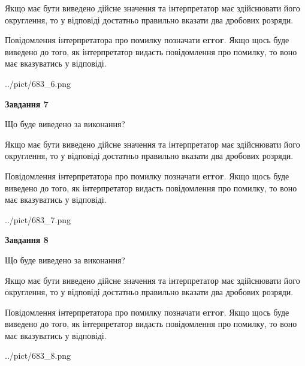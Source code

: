 \documentclass[12pt, ukrainian]{article}
\begin{document}
{\begin {Large}
Якщо має бути виведено дійсне значення та інтерпретатор має здійснювати його округлення, 
то у відповіді достатньо правильно вказати два дробових розряди.

Повідомлення інтерпретатора про помилку позначати \textbf{error}.
Якщо щось буде виведено до того, як інтерпретатор видасть повідомлення про помилку, 
то воно має вказуватись у відповіді. \par

\begin{center}
	{../pict/683_6.png}
\end{center}
\newpage

{\begin {center}\textbf{Завдання 7}\end {center}}\par
Що буде виведено за виконання? \par

Якщо має бути виведено дійсне значення та інтерпретатор має здійснювати його округлення, 
то у відповіді достатньо правильно вказати два дробових розряди.

Повідомлення інтерпретатора про помилку позначати \textbf{error}.
Якщо щось буде виведено до того, як інтерпретатор видасть повідомлення про помилку, 
то воно має вказуватись у відповіді. \par

\begin{center}
	{../pict/683_7.png}
\end{center}
\newpage

{\begin {center}\textbf{Завдання 8}\end {center}}\par
Що буде виведено за виконання? \par

Якщо має бути виведено дійсне значення та інтерпретатор має здійснювати його округлення, 
то у відповіді достатньо правильно вказати два дробових розряди.

Повідомлення інтерпретатора про помилку позначати \textbf{error}.
Якщо щось буде виведено до того, як інтерпретатор видасть повідомлення про помилку, 
то воно має вказуватись у відповіді. \par

\begin{center}
	{../pict/683_8.png}
\end{center}
\newpage


\end{Large}}
\end{document}
